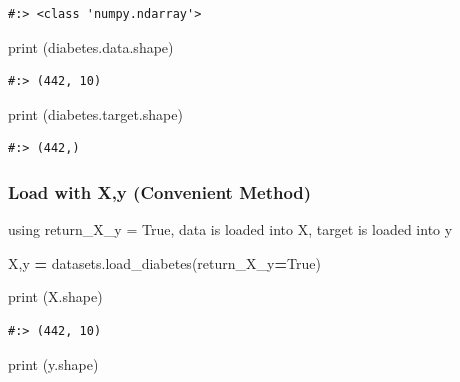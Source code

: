 \documentclass[
]{book}
\newenvironment{Shaded}{\begin{snugshade}}{\end{snugshade}}
\newcommand{\BuiltInTok}[1]{#1}
\newcommand{\NormalTok}[1]{#1}
\newcommand{\OperatorTok}[1]{\textcolor[rgb]{0.43,0.43,0.43}{\textbf{#1}}}
\newcommand{\VariableTok}[1]{\textcolor[rgb]{0,0,0}{#1}}
\begin{document}
\begin{verbatim}
#:> <class 'numpy.ndarray'>
\end{verbatim}

\begin{Shaded}
\begin{Highlighting}[]
\BuiltInTok{print}\NormalTok{ (diabetes.data.shape)}
\end{Highlighting}
\end{Shaded}

\begin{verbatim}
#:> (442, 10)
\end{verbatim}

\begin{Shaded}
\begin{Highlighting}[]
\BuiltInTok{print}\NormalTok{ (diabetes.target.shape)}
\end{Highlighting}
\end{Shaded}

\begin{verbatim}
#:> (442,)
\end{verbatim}

\hypertarget{load-with-xy-convenient-method}{%
\subsubsection{Load with X,y (Convenient Method)}\label{load-with-xy-convenient-method}}

using return\_X\_y = True, data is loaded into X, target is loaded into y

\begin{Shaded}
\begin{Highlighting}[]
\NormalTok{X,y      }\OperatorTok{=}\NormalTok{ datasets.load_diabetes(return_X_y}\OperatorTok{=}\VariableTok{True}\NormalTok{)}
\end{Highlighting}
\end{Shaded}

\begin{Shaded}
\begin{Highlighting}[]
\BuiltInTok{print}\NormalTok{ (X.shape)}
\end{Highlighting}
\end{Shaded}

\begin{verbatim}
#:> (442, 10)
\end{verbatim}

\begin{Shaded}
\begin{Highlighting}[]
\BuiltInTok{print}\NormalTok{ (y.shape)}
\end{Highlighting}
\end{Shaded}
\end{document}
